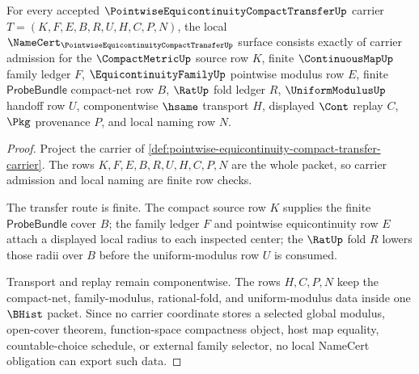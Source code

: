 \begin{theorem}
\label{thm:pointwise-equicontinuity-compact-transfer-namecert-obligations}
For every accepted $\PointwiseEquicontinuityCompactTransferUp$ carrier $T=(K,F,E,B,R,U,H,C,P,N)$, the local $\NameCert_{\PointwiseEquicontinuityCompactTransferUp}$ surface consists exactly of carrier admission for the $\CompactMetricUp$ source row $K$, finite $\ContinuousMapUp$ family ledger $F$, $\EquicontinuityFamilyUp$ pointwise modulus row $E$, finite $\mathsf{ProbeBundle}$ compact-net row $B$, $\RatUp$ fold ledger $R$, $\UniformModulusUp$ handoff row $U$, componentwise $\hsame$ transport $H$, displayed $\Cont$ replay $C$, $\Pkg$ provenance $P$, and local naming row $N$.
\end{theorem}
\begin{proof}
Project the carrier of \autoref{def:pointwise-equicontinuity-compact-transfer-carrier}. The rows $K,F,E,B,R,U,H,C,P,N$ are the whole packet, so carrier admission and local naming are finite row checks.

The transfer route is finite. The compact source row $K$ supplies the finite $\mathsf{ProbeBundle}$ cover $B$; the family ledger $F$ and pointwise equicontinuity row $E$ attach a displayed local radius to each inspected center; the $\RatUp$ fold $R$ lowers those radii over $B$ before the uniform-modulus row $U$ is consumed.

Transport and replay remain componentwise. The rows $H,C,P,N$ keep the compact-net, family-modulus, rational-fold, and uniform-modulus data inside one $\BHist$ packet. Since no carrier coordinate stores a selected global modulus, open-cover theorem, function-space compactness object, host map equality, countable-choice schedule, or external family selector, no local NameCert obligation can export such data.
\end{proof}


